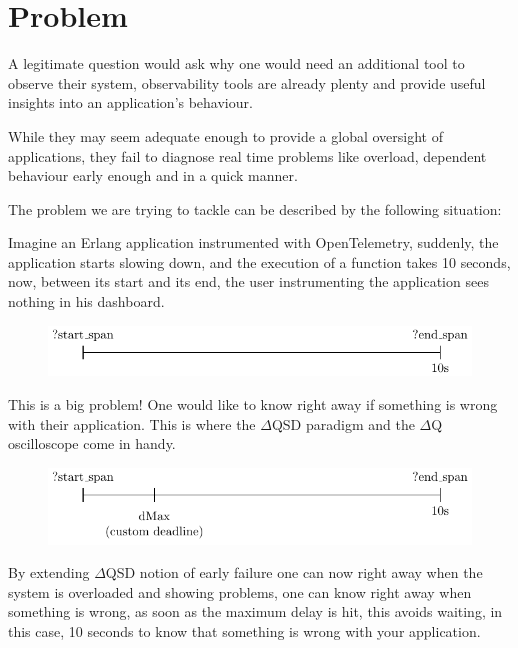 \section{Problem}
    A legitimate question would ask why one would need an additional tool to observe their system, observability tools are already plenty and provide useful insights into an application's behaviour.
    
    While they may seem adequate enough to provide a global oversight of applications, they fail to diagnose real time problems like overload, dependent behaviour early enough and in a quick manner. 
    
    The problem we are trying to tackle can be described by the following situation: 

    Imagine an Erlang application instrumented with OpenTelemetry, suddenly, the application starts slowing down, and the execution of a function takes 10 seconds, now, between its start and its end, the user instrumenting the application sees nothing in his dashboard.
    \begin{figure}[H]
        \begin{center}
            \includegraphics{tikz/start_end.pdf}
        \end{center}
    \end{figure}
    This is a big problem! One would like to know right away if something is wrong with their application. This is where the $\Delta$QSD paradigm and the $\Delta$Q oscilloscope come in handy.
    \begin{figure}[H]
        \begin{center}
            \includegraphics{tikz/start_end_dmax.pdf}
        \end{center}
    \end{figure} 
    By extending $\Delta$QSD notion of early failure one can now right away when the system is overloaded and showing problems, one can know right away when something is wrong, as soon as the maximum delay is hit, this avoids waiting, in this case, 10 seconds to know that something is wrong with your application. \label{timeout}
